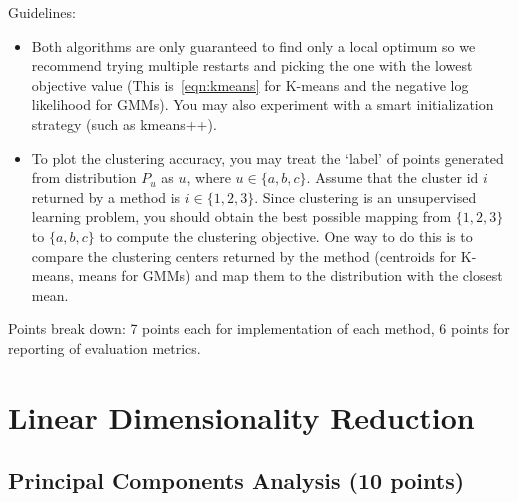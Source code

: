 \documentclass[a4paper]{article}
\newcounter{thm}
\theoremstyle{definition}
\begin{document}
Guidelines:
\begin{itemize}
	\item Both algorithms are only guaranteed to find only a local optimum so we recommend trying multiple
	      restarts and picking the one with the lowest objective value (This is~\eqref{eqn:kmeans} for K-means and the negative log likelihood for GMMs).
	      You may also experiment with a smart initialization
	      strategy (such as kmeans++).

	\item
	      To plot the clustering accuracy,  you may treat the `label' of points generated from distribution
	      $P_u$ as $u$, where $u\in \{a, b, c\}$.
	      Assume that the cluster id $i$ returned by a method is $i\in \{1, 2, 3\}$.
	      Since clustering is an unsupervised learning problem, you should obtain the best possible mapping
	      from $\{1, 2, 3\}$ to $\{a, b, c\}$ to compute the clustering objective.
	      One way to do this is to compare the clustering centers returned by the method (centroids for
	      K-means, means for GMMs) and map them to the distribution with the closest mean.

\end{itemize}

Points break down: 7 points each for implementation of each method, 6 points for reporting of
evaluation metrics.


\section{Linear Dimensionality Reduction}

\subsection{Principal Components Analysis  (10 points)}
\label{sec:pca}
\end{document}
